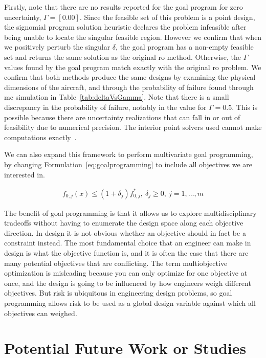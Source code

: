 Firstly, note that there are no results reported for the goal program
for zero uncertainty, $\Gamma = [0.00]$.
Since the feasible set of this problem is a point design, the signomial program
solution heuristic declares the problem infeasible after being
unable to locate the singular feasible region. However we confirm that when we positively perturb
the singular $\delta$, the goal program has a non-empty feasible set and
returns the same solution as the original \gls{ro} method.
Otherwise, the $\Gamma$ values found by the goal program match exactly
with the original \gls{ro} problem. We confirm that both methods produce
the same designs by examining the physical dimensions of the aircraft, and through the probability
of failure found through \gls{mc} simulation in Table~\ref{tab:deltaVsGamma}.
Note that there is a small discrepancy
in the probability of failure, notably in the value for $\Gamma = 0.5$. This is
possible because there are uncertainty realizations that can fall
in or out of feasibility due to numerical precision. The interior point solvers
used cannot make computations exactly~\cite{Nesterov1994}.

We can also expand this framework to perform multivariate goal programming,
by changing Formulation~\ref{eq:goalprogramming} to include all
objectives we are interested in.

\begin{align*}
    f_{0,j}(x) \leq (1+\delta_j) f^*_{0,j},~\delta_j \geq 0,~j = 1,\ldots, m
    \label{eq:multigoal}
\end{align*}

The benefit of goal programming is that it allows us to explore multidisciplinary tradeoffs without
having to enumerate the design space along each objective direction.
In design it is not obvious whether an objective should in fact be a constraint instead. The most
fundamental choice that an engineer can make in design is what the objective function is, and it is
often the case that there are many potential objectives that are conflicting.
The term multiobjective optimization is misleading
because you can only optimize for one objective at once,
and the design is going to be influenced by how engineers weigh different objectives.
But risk is ubiquitous in engineering design problems, so goal programming allows risk to be used as
a global design variable against which all objectives can weighed.

\section{Potential Future Work or Studies}


